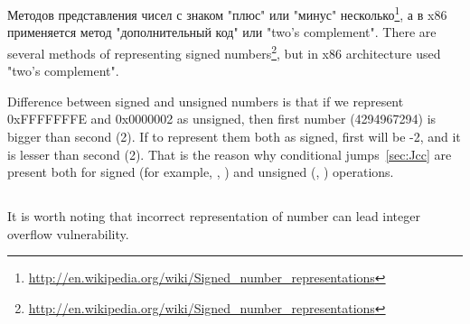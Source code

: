 ﻿%

\section{\SignedNumbersSectionName}
\label{sec:signednumbers}

\newcommand{\URLS}{\url{http://en.wikipedia.org/wiki/Signed_number_representations}}

\IFRU
{Методов представления чисел с знаком "плюс" или "минус" несколько\footnote{\URLS}, 
а в x86 применяется метод "дополнительный код" или "two's complement".}
{There are several methods of representing signed numbers\footnote{\URLS}, 
but in x86 architecture used "two's complement".}

{Difference between signed and unsigned numbers is that if we represent 0xFFFFFFFE and 0x0000002 
as unsigned, then first number (4294967294) is bigger than second (2). 
If to represent them both as signed, first will be -2, and it is lesser than second (2). 
That is the reason why conditional jumps~\ref{sec:Jcc} are present both for signed (for example, \JG, \JL) 
and unsigned (\JA, \JB) operations.}

\subsection{}

{It is worth noting that incorrect representation of number can lead integer overflow vulnerability.}

